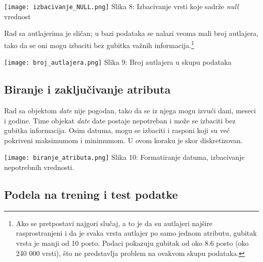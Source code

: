 \documentclass[a4paper]{article}
\begin{document}
{\noindent\begin{minipage}{1.0\textwidth}
\texttt{[image: izbacivanje\_NULL.png]}
\hphantom{aaaaaaaaaaaaaaaa}Slika 8: Izbacivanje vrsti koje sadrže {\em null} vrednost\\
\end{minipage}

Rad sa autlajerima je sličan; u bazi podataka se nalazi veoma mali broj autlajera, tako da se oni mogu izbaciti bez gubitka važnih informacija.\footnote[2]{Ako se pretpostavi najgori slučaj, a to je da su autlajeri najšire rasprostranjeni i da je svaka vrsta autlajer po samo jednom atributu, gubitak vrsta je manji od 10 posto. Podaci pokazuju gubitak od oko 8.6 posto (oko 240 000 vrsti), što ne predstavlja problem na ovakvom skupu podataka.}\\

\noindent\begin{minipage}{1.0\textwidth}
\texttt{[image: broj\_autlajera.png]}
\hphantom{aaaaaaaaaaaaaaaaaaaa}Slika 9: Broj autlajera u skupu podataka\\
\end{minipage}

\subsection{Biranje i zaključivanje atributa}
\label{biranje}

\noindent\begin{minipage}{0.4\textwidth}
Rad sa objektom {\em date} nije pogodan, tako da se iz njega mogu izvući dani, meseci i godine. Time objekat {\em date} date postaje nepotreban i može se izbaciti bez gubitka informacija. Osim datuma, mogu se izbaciti i rasponi koji su već pokriveni maksimumom i minimumom. U ovom koraku je skor diskretizovan.
\end{minipage}
\begin{minipage}{0.1\textwidth}
\hphantom{a}
\end{minipage}
\begin{minipage}{0.6\textwidth}
\texttt{[image: biranje\_atributa.png]}
Slika 10: Formatiranje datuma, izbacivanje nepotrebnih vrednosti.\\
\end{minipage}

\subsection{Podela na trening i test podatke}
\label{podela}

}
\end{document}
